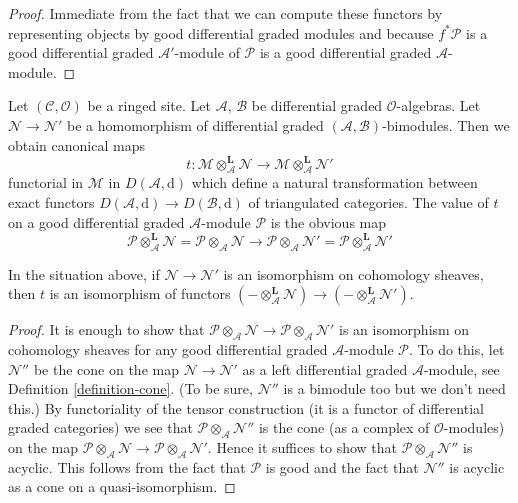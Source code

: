 \begin{proof}
Immediate from the fact that we can compute these functors
by representing objects by good differential graded modules
and because $f^*\mathcal{P}$ is a good differential
graded $\mathcal{A}'$-module of $\mathcal{P}$ is a good
differential graded $\mathcal{A}$-module.
\end{proof}

\noindent
Let $(\mathcal{C}, \mathcal{O})$ be a ringed site. Let
$\mathcal{A}$, $\mathcal{B}$ be differential graded $\mathcal{O}$-algebras.
Let $\mathcal{N} \to \mathcal{N}'$ be a homomorphism of differential graded
$(\mathcal{A}, \mathcal{B})$-bimodules. Then we obtain canonical
maps
$$
t :
\mathcal{M} \otimes_\mathcal{A}^\mathbf{L} \mathcal{N}
\longrightarrow
\mathcal{M} \otimes_\mathcal{A}^\mathbf{L} \mathcal{N}'
$$
functorial in $\mathcal{M}$ in $D(\mathcal{A}, \text{d})$
which define a natural transformation between exact functors
$D(\mathcal{A}, \text{d}) \to D(\mathcal{B}, \text{d})$
of triangulated categories. The value of $t$ on a good differential
graded $\mathcal{A}$-module $\mathcal{P}$ is the obvious map
$$
\mathcal{P} \otimes_\mathcal{A}^\mathbf{L} \mathcal{N} =
\mathcal{P} \otimes_\mathcal{A} \mathcal{N}
\longrightarrow
\mathcal{P} \otimes_\mathcal{A} \mathcal{N}' =
\mathcal{P} \otimes_\mathcal{A}^\mathbf{L} \mathcal{N}'
$$

\begin{lemma}
\label{lemma-tensor-symmetry}
In the situation above, if $\mathcal{N} \to \mathcal{N}'$ is an isomorphism
on cohomology sheaves, then $t$ is an isomorphism of functors
$(- \otimes_\mathcal{A}^\mathbf{L} \mathcal{N}) \to
(- \otimes_\mathcal{A}^\mathbf{L} \mathcal{N}')$.
\end{lemma}

\begin{proof}
It is enough to show that
$\mathcal{P} \otimes_\mathcal{A} \mathcal{N} \to
\mathcal{P} \otimes_\mathcal{A} \mathcal{N}'$
is an isomorphism on cohomology sheaves for any good differential
graded $\mathcal{A}$-module $\mathcal{P}$.
To do this, let $\mathcal{N}''$ be the cone on the map
$\mathcal{N} \to \mathcal{N}'$ as a left differential graded
$\mathcal{A}$-module, see Definition \ref{definition-cone}.
(To be sure, $\mathcal{N}''$ is a bimodule too but we
don't need this.) By functoriality of the tensor construction
(it is a functor of differential graded categories)
we see that $\mathcal{P} \otimes_\mathcal{A} \mathcal{N}''$
is the cone (as a complex of $\mathcal{O}$-modules) on the map
$\mathcal{P} \otimes_\mathcal{A} \mathcal{N} \to
\mathcal{P} \otimes_\mathcal{A} \mathcal{N}'$.
Hence it suffices to show that
$\mathcal{P} \otimes_\mathcal{A} \mathcal{N}''$
is acyclic. This follows from the fact that $\mathcal{P}$
is good and the fact that $\mathcal{N}''$ is acyclic
as a cone on a quasi-isomorphism.
\end{proof}

